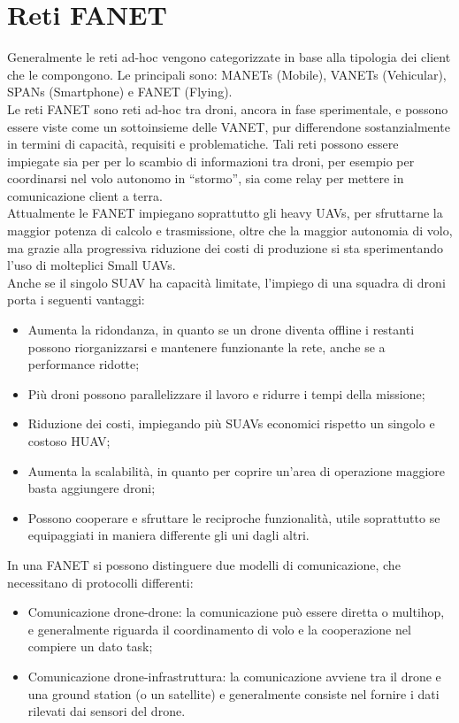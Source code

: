 \section[Reti FANET]{Reti FANET}
Generalmente le reti ad-hoc vengono categorizzate in base alla tipologia dei client che le compongono. Le principali sono: MANETs (Mobile), VANETs (Vehicular), SPANs (Smartphone) e FANET (Flying). \\
Le reti FANET sono reti ad-hoc tra droni, ancora in fase sperimentale, e possono essere viste come un sottoinsieme delle VANET, pur differendone sostanzialmente in termini di capacità, requisiti e problematiche. 
Tali reti possono essere impiegate sia per per lo scambio di informazioni tra droni, per esempio per coordinarsi nel volo autonomo in “stormo”, sia come relay per mettere in comunicazione client a terra. \\
Attualmente le FANET impiegano soprattutto gli heavy UAVs, per sfruttarne la maggior potenza di calcolo e trasmissione, oltre che la maggior autonomia di volo, ma grazie alla progressiva riduzione dei costi di produzione si sta sperimentando l'uso di molteplici Small UAVs. \\
Anche se il singolo SUAV ha capacità limitate, l'impiego di una squadra di droni  porta i seguenti vantaggi:
\begin{itemize}
	\item Aumenta la ridondanza, in quanto se un drone diventa offline i restanti possono riorganizzarsi e mantenere funzionante la rete, anche se a performance ridotte;
	\item Più droni possono parallelizzare il lavoro e ridurre i tempi della missione;
	\item Riduzione dei costi, impiegando più SUAVs economici rispetto un singolo e costoso HUAV;
	\item Aumenta la scalabilità, in quanto per coprire un'area di operazione maggiore basta aggiungere droni;
	\item Possono cooperare e sfruttare le reciproche funzionalità, utile soprattutto se equipaggiati in maniera differente gli uni dagli altri.
\end{itemize}

In una FANET si possono distinguere due modelli di comunicazione, che necessitano di protocolli differenti:
\begin{itemize}
	\item Comunicazione drone-drone: la comunicazione può essere diretta o multihop, e generalmente riguarda il coordinamento di volo e la cooperazione nel compiere un dato task;
	\item Comunicazione drone-infrastruttura: la comunicazione avviene tra il drone e una ground station (o un satellite) e generalmente consiste nel fornire i dati rilevati dai sensori del drone.
\end{itemize}

